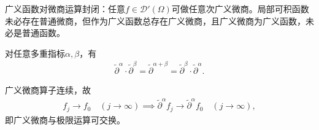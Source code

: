 \documentclass[../../main.tex]{subfiles}%
\begin{document}
\begin{remark}
广义函数对微商运算封闭：任意$f\in\mathscr{D}'(\Omega)$可做任意次广义微商。局部可积函数未必存在普通微商，但作为广义函数总存在广义微商，且广义微商为广义函数，未必是普通函数。
\end{remark}

\begin{remark}
对任意多重指标$\alpha,\beta$，有
\begin{align*}
\widetilde{\partial}^\alpha\cdot\widetilde{\partial}^\beta=\widetilde{\partial}^{\alpha+\beta}=\widetilde{\partial}^\beta\cdot\widetilde{\partial}^\alpha.
\end{align*}
\end{remark}

\begin{remark}
广义微商算子连续，故
\begin{align*}
f_j\to f_0\quad(j\to\infty)\implies\widetilde{\partial}^\alpha f_j\to\widetilde{\partial}^\alpha f_0\quad(j\to\infty),
\end{align*}
即广义微商与极限运算可交换。
\end{remark}
\end{document}
